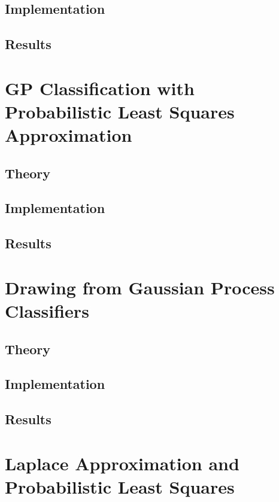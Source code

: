 		\subsection{Implementation}
		
		\subsection{Results}
		
	\section{GP Classification with Probabilistic Least Squares Approximation}

		\subsection{Theory}
		
		\subsection{Implementation}
			
		\subsection{Results}
				
	\section{Drawing from Gaussian Process Classifiers}
				
		\subsection{Theory}
		
		\subsection{Implementation}
			
		\subsection{Results}

	\section{Laplace Approximation and Probabilistic Least Squares}
	
